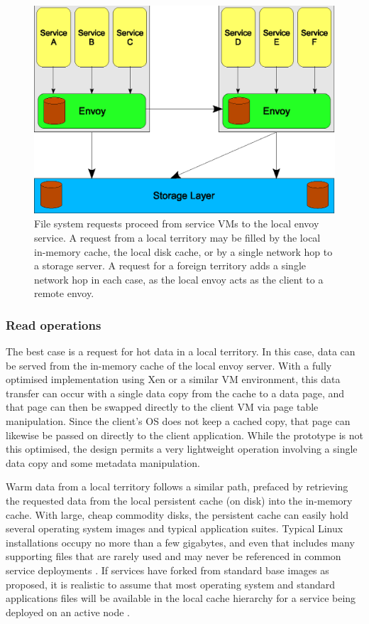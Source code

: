 \begin{figure}[tp]
\centering
\includegraphics[width=\figwidth]{figures/hops}
\caption[Network paths taken by typical file requests]{File system requests proceed from service VMs to the local envoy service. A request from a local territory may be filled by the local in-memory cache, the local disk cache, or by a single network hop to a storage server. A request for a foreign territory adds a single network hop in each case, as the local envoy acts as the client to a remote envoy.}
\label{fig:hops}
\end{figure}

\subsubsection{Read operations}\label{sec:data-paths-read}

The best case is a request for hot data in a local territory. In this case, data can be served from the in-memory cache of the local envoy server. With a fully optimised implementation using Xen or a similar VM environment, this data transfer can occur with a single data copy from the cache to a data page, and that page can then be swapped directly to the client VM via page table manipulation. Since the client's OS does not keep a cached copy, that page can likewise be passed on directly to the client application. While the prototype is not this optimised, the design permits a very lightweight operation involving a single data copy and some metadata manipulation.

Warm data from a local territory follows a similar path, prefaced by retrieving the requested data from the local persistent cache (on disk) into the in-memory cache. With large, cheap commodity disks, the persistent cache can easily hold several operating system images and typical application suites. Typical Linux installations occupy no more than a few gigabytes, and even that includes many supporting files that are rarely used and may never be referenced in common service deployments \cite{gibson98b}. If services have forked from standard base images as proposed, it is realistic to assume that most operating system and standard applications files will be available in the local cache hierarchy for a service being deployed on an active node \cite{klosterman}.

